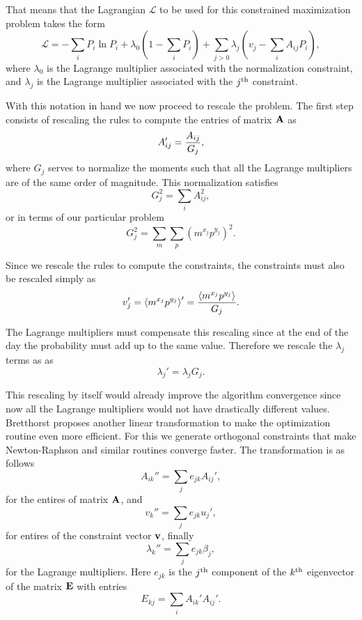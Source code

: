 That means that the Lagrangian $\mathcal{L}$ to be used for this constrained
maximization problem takes the form
\begin{equation}
  \mathcal{L} = -\sum_i P_i \ln P_i + \lambda_0 \left( 1 - \sum_i P_i \right)
  + \sum_{j>0} \lambda_j \left( v_j - \sum_i A_{ij} P_i \right),
\end{equation}
where $\lambda_0$ is the Lagrange multiplier associated with the normalization
constraint, and $\lambda_j$ is the Lagrange multiplier associated with the
$j^\text{th}$ constraint.

With this notation in hand we now proceed to rescale the problem. The first
step consists of rescaling the rules to compute the entries of matrix $\mathbf{A}$
as
\begin{equation}
  A_{ij}' = {A_{ij} \over G_j},
\end{equation}
where $G_j$ serves to normalize the moments such that all the Lagrange
multipliers are of the same order of magnitude. This normalization satisfies
\begin{equation}
G_j^2 = \sum_i A_{ij}^2,
\end{equation}
or in terms of our particular problem
\begin{equation}
G_j^2 = \sum_m \sum_p \left( m^{x_j} p^{y_j} \right)^2.
\end{equation}

Since we rescale the rules to compute the constraints, the constraints must
also be rescaled simply as
\begin{equation}
v_j' = \left\langle m^{x_j} p^{y_j} \right\rangle' = {\left\langle m^{x_j} p^{y_j} \right\rangle \over G_j}.
\end{equation}

The Lagrange multipliers must compensate this rescaling since at the end of the
day the probability must add up to the same value. Therefore we rescale the
$\lambda_j$ terms as as
\begin{equation}
\lambda_j' = \lambda_j G_j.
\end{equation}

This rescaling by itself would already improve the algorithm convergence since
now all the Lagrange multipliers would not have drastically different values.
Bretthorst proposes another linear transformation to make the optimization
routine even more efficient. For this we generate orthogonal constraints that
make Newton-Raphson and similar routines converge faster. The transformation is
as follows
\begin{equation}
  A_{ik}'' = \sum_j {e}_{jk} A_{ij}',
\end{equation}
for the entires of matrix $\mathbf{A}$, and
\begin{equation}
  v_k'' = \sum_j {e}_{jk} u_j',
\end{equation}
for entires of the constraint vector $\mathbf{v}$, finally
\begin{equation}
  \lambda_k'' = \sum_j {e}_{jk} \beta_j,
\end{equation}
for the Lagrange multipliers. Here ${e}_{jk}$ is the $j^\text{th}$ component
of the $k^\text{th}$ eigenvector of the matrix $\mathbf{E}$ with entries
\begin{equation}
  {E}_{kj} = \sum_i {A}_{ik}' {A}_{ij}'.
\end{equation}

